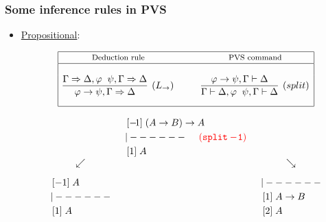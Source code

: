 \documentclass[10pt]{beamer}
\begin{document}
\begin{frame}
	\frametitle{Some inference rules in PVS}
\begin{itemize}
\item \underline{{\color{blue}Propositional}}:
{\scriptsize
\begin{table}
\vspace{-5mm}
\[\begin{array}{|c@{\hspace{1cm}}c|}
\hline
\mbox{\footnotesize Deduction rule} & \mbox{\footnotesize PVS command} \\
\hline
&\\
\infer[(L_\rightarrow)]{\varphi\rightarrow\psi,\Gamma\Rightarrow\Delta}{\Gamma\Rightarrow\Delta,\varphi\;\;\psi,\Gamma\Rightarrow\Delta} & 
\infer[(split)]{\Gamma\vdash\Delta,\varphi\;\;\psi,\Gamma\vdash\Delta}{\varphi\rightarrow\psi,\Gamma\vdash\Delta} \\[3mm]
\hline
\end{array}\]
\end{table}
}

\[\begin{array}{clc}
   & \,[-\!1]\; (A\rightarrow B)\rightarrow A&\\[1mm]
    &{\small{\tt{|------}}} \hspace{5mm}{\color{red}{\tt (split -\!1) }}& \\[1mm]
   & \,[1]\;  A & \\
  \swarrow& & \searrow \\[3mm]
\begin{array}{l}
 \,[-1]\; A  \\[1mm]
    {\small{\tt{|------}}} \\[1mm]
    \,[1]\; A 
\end{array} & & 
\begin{array}{l}
{\small{\tt{|------}}} \\[1mm]
    \,[1]\; A \rightarrow B \\[1mm]
    \,[2]\; A 
\end{array} 
   \end{array}         
  \]

\end{itemize}
\end{frame}
\end{document}
